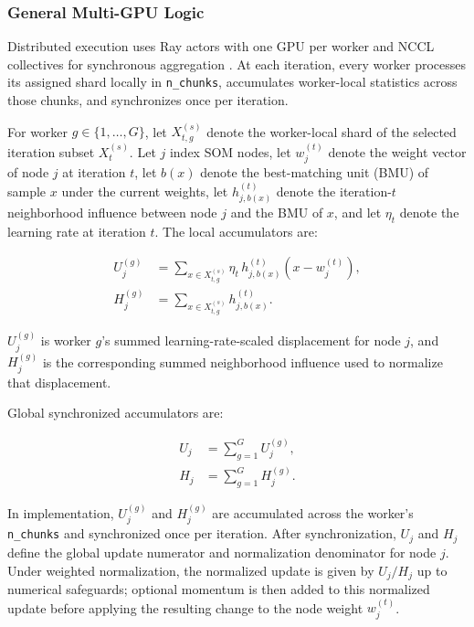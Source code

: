 \documentclass[10pt]{article} %
\begin{document}
\subsubsection{General Multi-GPU Logic}

Distributed execution uses Ray actors with one GPU per worker and NCCL collectives for synchronous aggregation \citep{moritzRayDistributedFramework2018}. At each iteration, every worker processes its assigned shard locally in \texttt{n\_chunks}, accumulates worker-local statistics across those chunks, and synchronizes once per iteration.

For worker $g \in \{1,\dots,G\}$, let $X_{t,g}^{(s)}$ denote the worker-local shard of the selected iteration subset $X_t^{(s)}$. Let $j$ index SOM nodes, let $w_j^{(t)}$ denote the weight vector of node $j$ at iteration $t$, let $b(x)$ denote the best-matching unit (BMU) of sample $x$ under the current weights, let $h_{j,b(x)}^{(t)}$ denote the iteration-$t$ neighborhood influence between node $j$ and the BMU of $x$, and let $\eta_t$ denote the learning rate at iteration $t$. The local accumulators are:

\begin{equation}
\begin{aligned}
 U_j^{(g)} &= \sum_{x \in X_{t,g}^{(s)}} \eta_t\,h_{j,b(x)}^{(t)}(x-w_j^{(t)}), \\
 H_j^{(g)} &= \sum_{x \in X_{t,g}^{(s)}} h_{j,b(x)}^{(t)}.
\end{aligned}
\end{equation}

$U_j^{(g)}$ is worker $g$'s summed learning-rate-scaled displacement for node $j$, and $H_j^{(g)}$ is the corresponding summed neighborhood influence used to normalize that displacement.

Global synchronized accumulators are:

\begin{equation}
\begin{aligned}
U_j &= \sum_{g=1}^{G} U_j^{(g)}, \\
H_j &= \sum_{g=1}^{G} H_j^{(g)}.
\end{aligned}
\end{equation}

In implementation, $U_j^{(g)}$ and $H_j^{(g)}$ are accumulated across the worker's \texttt{n\_chunks} and synchronized once per iteration. After synchronization, $U_j$ and $H_j$ define the global update numerator and normalization denominator for node $j$. Under weighted normalization, the normalized update is given by $U_j/H_j$ up to numerical safeguards; optional momentum is then added to this normalized update before applying the resulting change to the node weight $w_j^{(t)}$.
\end{document}
